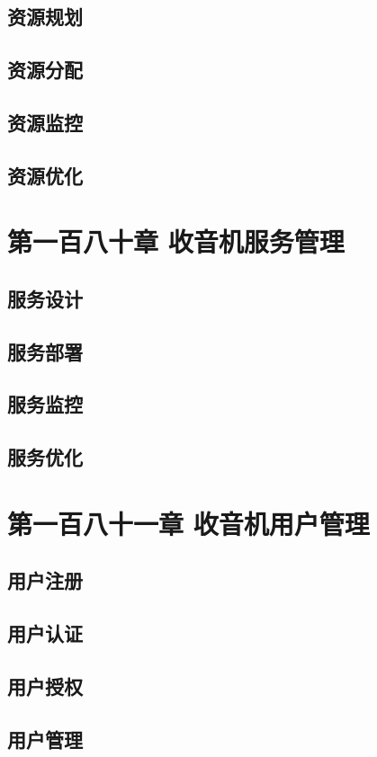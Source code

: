 \documentclass[12pt,UTF8]{ctexbook}
\begin{document}
\section{资源规划}
\section{资源分配}
\section{资源监控}
\section{资源优化}

\chapter{第一百八十章 收音机服务管理}

\section{服务设计}
\section{服务部署}
\section{服务监控}
\section{服务优化}

\chapter{第一百八十一章 收音机用户管理}

\section{用户注册}
\section{用户认证}
\section{用户授权}
\section{用户管理}
\end{document}
